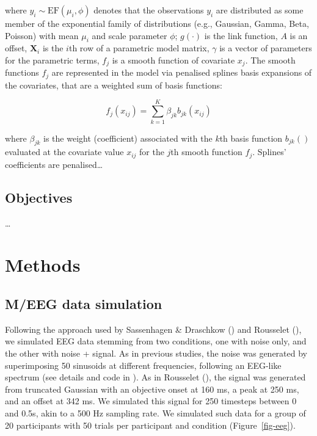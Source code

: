 \documentclass[
  doc,
  floatsintext,
  longtable,
  a4paper,
  nolmodern,
  notxfonts,
  notimes,
  colorlinks=true,linkcolor=blue,citecolor=blue,urlcolor=blue]{apa7}
\begin{document}
where \(y_{i} \sim \mathrm{EF}\left(\mu_{i}, \phi\right)\) denotes that
the observations \(y_{i}\) are distributed as some member of the
exponential family of distributions (e.g., Gaussian, Gamma, Beta,
Poisson) with mean \(\mu_{i}\) and scale parameter \(\phi\);
\(g(\cdot)\) is the link function, \(A\) is an offset,
\(\mathbf{X}_{i}\) is the \(i\)th row of a parametric model matrix,
\(\gamma\) is a vector of parameters for the parametric terms, \(f_{j}\)
is a smooth function of covariate \(x_{j}\). The smooth functions
\(f_{j}\) are represented in the model via penalised splines basis
expansions of the covariates, that are a weighted sum of basis
functions:

\[
f_{j}\left(x_{i j}\right) = \sum_{k=1}^K \beta_{jk} b_{jk}\left(x_{ij}\right)
\]

where \(\beta_{jk}\) is the weight (coefficient) associated with the
\(k\)th basis function \(b_{jk}()\) evaluated at the covariate value
\(x_{ij}\) for the \(j\)th smooth function \(f_{j}\). Splines'
coefficients are penalised\ldots{}

\subsection{Objectives}\label{objectives}

\ldots{}

\section{Methods}\label{methods}

\subsection{M/EEG data simulation}\label{meeg-data-simulation}

Following the approach used by Sassenhagen \& Draschkow
() and Rousselet
(), we simulated EEG data
stemming from two conditions, one with noise only, and the other with
noise + signal. As in previous studies, the noise was generated by
superimposing 50 sinusoids at different frequencies, following an
EEG-like spectrum (see details and code in
). As in Rousselet
(), the signal was generated
from truncated Gaussian with an objective onset at 160 ms, a peak at 250
ms, and an offset at 342 ms. We simulated this signal for 250 timesteps
between 0 and 0.5s, akin to a 500 Hz sampling rate. We simulated such
data for a group of 20 participants with 50 trials per participant and
condition (Figure~\ref{fig-eeg}).
\end{document}

